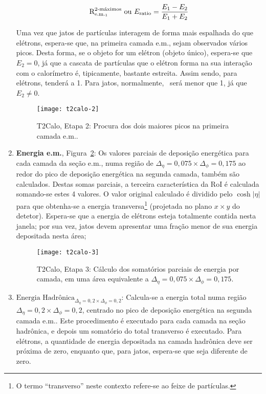 \begin{enumerate}
\begin{equation}
\eratio \text{ ou } E_\text{ratio} = \frac{E_1-E_2}{E_1+E_2}
\end{equation}

Uma vez que jatos de par\-tí\-culas interagem de forma mais espalhada do que
e\-lé\-trons, espera-se que, na primeira camada e.m., sejam observados vários
picos. Desta forma, se o objeto for um elétron (objeto único), espera-se que
$E_2=0$, já que a cascata de partículas que o elétron forma na sua interação
com o calorímetro é, tipicamente, bastante estreita. Assim sendo, para
elétrons, \eratio tenderá a 1. Para jatos, normalmente, \eratio\ será menor
que 1, já que $E_2 \neq 0$.

\begin{figure}
\begin{center}
\texttt{[image: t2calo-2]}
\end{center}
\caption{T2Calo, Etapa 2: Procura dos dois maiores picos na primeira camada e.m..}
\label{fig:t2calo-2}
\end{figure}

\item \textbf{Energia e.m.}, Figura~\ref{fig:t2calo-3}: Os valores parciais de
deposição energética para cada camada da seção e.m., numa região de
$\Delta_\eta=0,075\times\Delta_\phi=0,175$ ao redor do pico de deposição
energética na segunda camada, também são calculados. Destas somas parciais, a
terceira característica da RoI é calculada somando-se estes 4 valores. O valor
original calculado é dividido pelo $\cosh{|\eta|}$ para que obtenha-se a
energia transversa\footnote{O termo ``transverso'' neste contexto refere-se ao
feixe de partículas.} (projetada no plano $x \times y$ do detetor). Espera-se
que a energia de elétrons esteja totalmente contida nesta janela; por sua vez,
jatos devem apresentar uma fração menor de sua energia depositada nesta área;

\begin{figure}
\begin{center}
\texttt{[image: t2calo-3]}
\end{center}
\caption{T2Calo, Etapa 3: Cálculo dos somatórios parciais de energia por
camada, em uma área equivalente a $\Delta_\eta=0,075\times\Delta_\phi=0,175$.}
\label{fig:t2calo-3}
\end{figure}

\item \textbf{$\text{Energia
Hadrônica}_{\Delta_\eta=0,2\times\Delta_\phi=0,2}$}: Calcula-se a energia
total numa região $\Delta_\eta=0,2\times\Delta_\phi=0,2$, centrado no pico de
deposição energética na segunda camada e.m.. Este procedimento é executado
para cada camada na seção hadrônica, e depois um somatório do total transverso
é executado. Para elétrons, a quantidade de energia depositada na camada
hadrônica deve ser próxima de zero, enquanto que, para jatos, espera-se que
seja diferente de zero.


\end{enumerate}
